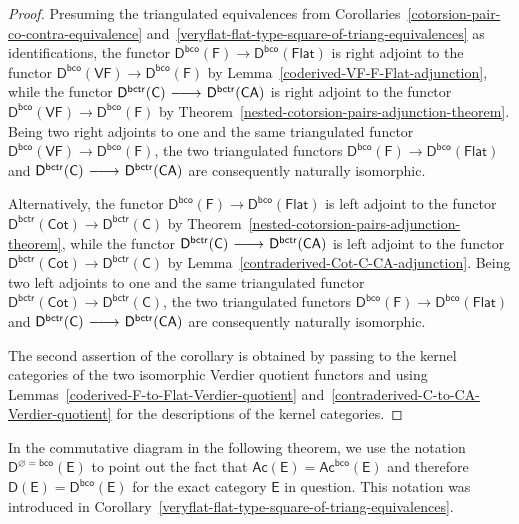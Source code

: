 \documentclass[12pt,a4paper]{amsart}
\newcommand{\+}{\nobreakdash-}
\renewcommand{\:}{\colon}
\newcommand{\rarrow}{\longrightarrow}
\newcommand{\lrarrow}{\mskip.5\thinmuskip\relbar\joinrel\relbar\joinrel
 \rightarrow\mskip.5\thinmuskip\relax}
\newcommand{\sC}{\mathsf C}
\newcommand{\sD}{\mathsf D}
\newcommand{\sE}{\mathsf E}
\newcommand{\sF}{\mathsf F}
\newcommand{\VF}{\mathsf{VF}}
\newcommand{\CA}{\mathsf{CA}}
\newcommand{\Flat}{\mathsf{Flat}}
\newcommand{\Cot}{\mathsf{Cot}}
\newcommand{\Ac}{\mathsf{Ac}}
\newcommand{\bco}{\mathsf{bco}}
\newcommand{\bctr}{\mathsf{bctr}}
\theoremstyle{plain}
\theoremstyle{definition}
\begin{document}
\begin{proof}
 Presuming the triangulated equivalences from
Corollaries~\ref{cotorsion-pair-co-contra-equivalence}
and~\ref{veryflat-flat-type-square-of-triang-equivalences}
as identifications, the functor
$\sD^\bco(\sF)\rarrow\sD^\bco(\Flat)$ is right adjoint to
the functor $\sD^\bco(\VF)\rarrow\sD^\bco(\sF)$ by
Lemma~\ref{coderived-VF-F-Flat-adjunction}, while the functor
$\sD^\bctr(\sC)\lrarrow\sD^\bctr(\CA)$ is right adjoint to
the functor $\sD^\bco(\VF)\rarrow\sD^\bco(\sF)$ by
Theorem~\ref{nested-cotorsion-pairs-adjunction-theorem}.
 Being two right adjoints to one and the same triangulated functor
$\sD^\bco(\VF)\rarrow\sD^\bco(\sF)$, the two triangulated functors
$\sD^\bco(\sF)\rarrow\sD^\bco(\Flat)$ and $\sD^\bctr(\sC)\lrarrow
\sD^\bctr(\CA)$ are consequently naturally isomorphic.

 Alternatively, the functor $\sD^\bco(\sF)\rarrow\sD^\bco(\Flat)$
is left adjoint to the functor $\sD^\bctr(\Cot)\rarrow\sD^\bctr(\sC)$
by Theorem~\ref{nested-cotorsion-pairs-adjunction-theorem}, while
the functor $\sD^\bctr(\sC)\lrarrow\sD^\bctr(\CA)$ is left adjoint
to the functor $\sD^\bctr(\Cot)\rarrow\sD^\bctr(\sC)$ by
Lemma~\ref{contraderived-Cot-C-CA-adjunction}.
 Being two left adjoints to one and the same triangulated functor
$\sD^\bctr(\Cot)\rarrow\sD^\bctr(\sC)$, the two triangulated functors
$\sD^\bco(\sF)\rarrow\sD^\bco(\Flat)$ and $\sD^\bctr(\sC)\lrarrow
\sD^\bctr(\CA)$ are consequently naturally isomorphic.

 The second assertion of the corollary is obtained by passing to
the kernel categories of the two isomorphic Verdier quotient functors
and using Lemmas~\ref{coderived-F-to-Flat-Verdier-quotient}
and~\ref{contraderived-C-to-CA-Verdier-quotient} for the descriptions
of the kernel categories.
\end{proof}

 In the commutative diagram in the following theorem, we use
the notation $\sD^{\varnothing=\bco}(\sE)$ to point out the fact
that $\Ac(\sE)=\Ac^\bco(\sE)$ and therefore $\sD(\sE)=\sD^\bco(\sE)$
for the exact category $\sE$ in question.
 This notation was introduced in
Corollary~\ref{veryflat-flat-type-square-of-triang-equivalences}.
\end{document}
